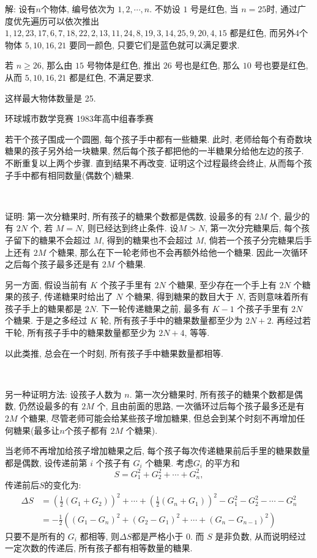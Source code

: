 解: 设有$n$个物体, 编号依次为 $1,2,\cdots,n$. 不妨设 $1$ 号是红色, 当 $n=25$时, 通过广度优先遍历可以依次推出 $1, 12, 23, 17, 6, 7, 18, 22, 2, 13, 11, 24, 8, 19, 3, 14, 25, 9, 20, 4, 15$ 都是红色, 而另外4个物体 $5, 10, 16, 21$ 要同一颜色, 只要它们是蓝色就可以满足要求. 

若 $n\ge 26$, 那么由 $15$ 号物体是红色, 推出 $26$ 号也是红色, 那么 $10$ 号也要是红色, 从而 $5,10,16,21$ 都是红色, 不满足要求.

这样最大物体数量是 25.

\newpage
\noindent 环球城市数学竞赛 1983年高中组春季赛

若干个孩子围成一个圆圈, 每个孩子手中都有一些糖果. 此时, 老师给每个有奇数块糖果的孩子另外给一块糖果, 然后每个孩子都把他的一半糖果分给他左边的孩子. 不断重复以上两个步骤. 直到结果不再改变. 证明这个过程最终会终止, 从而每个孩子手中都有相同数量(偶数个)糖果.

~

证明: 第一次分糖果时, 所有孩子的糖果个数都是偶数, 设最多的有 $2M$ 个, 最少的有 $2N$ 个, 若 $M=N$, 则已经达到终止条件. 设$M>N$, 第一次分完糖果后, 每个孩子留下的糖果不会超过 $M$, 得到的糖果也不会超过 $M$, 倘若一个孩子分完糖果后手上还有 $2M$ 个糖果, 那么在下一轮老师也不会再额外给他一个糖果. 因此一次循环之后每个孩子最多还是有 $2M$ 个糖果. 

另一方面, 假设当前有 $K$ 个孩子手里有 $2N$ 个糖果, 至少存在一个手上有 $2N$ 个糖果的孩子, 传递糖果时给出了 $N$ 个糖果, 得到糖果的数目大于 $N$, 否则意味着所有孩子手上的糖果都是 $2N$. 下一轮传递糖果之前, 最多有 $K - 1$ 个孩子手里有 $2N$ 个糖果. 于是之多经过 $K$ 轮, 所有孩子手中的糖果数量都至少为 $2N+2$. 再经过若干轮, 所有孩子手中的糖果数量都至少为 $2N+4$, 等等.

以此类推, 总会在一个时刻, 所有孩子手中糖果数量都相等.

~

另一种证明方法: 设孩子人数为 $n$. 第一次分糖果时, 所有孩子的糖果个数都是偶数, 仍然设最多的有 $2M$ 个, 且由前面的思路, 一次循环过后每个孩子最多还是有 $2M$ 个糖果, 尽管老师可能会给某些孩子增加糖果, 但总会到某个时刻不再增加任何糖果(最多让$n$个孩子都有 $2M$ 个糖果).

当老师不再增加给孩子增加糖果之后, 每个孩子每次传递糖果前后手里的糖果数量都是偶数, 设传递前第 $i$ 个孩子有 $G_i$ 个糖果. 考虑$G_i$ 的平方和
\[S = G_1^2 + G_2^2 + \cdots + G_n^2 ,\]
传递前后$S$的变化为:
\begin{align*}
\Delta S &= \left(\frac{1}{2}(G_1+G_2)\right)^2 + \cdots + \left(\frac{1}{2}(G_n+G_1)\right)^2 - G_1^2 - G_2^2 - \cdots - G_n^2 \\
&= -\frac{1}{2}\left((G_1 - G_n)^2 + (G_2-G_1)^2 + \cdots + (G_n - G_{n-1})^2\right)
\end{align*}
只要不是所有的 $G_i$ 都相等, 则$\Delta S$都是严格小于 0. 而 $S$ 是非负数, 从而说明经过一定次数的传递后, 所有孩子都有相等数量的糖果.


